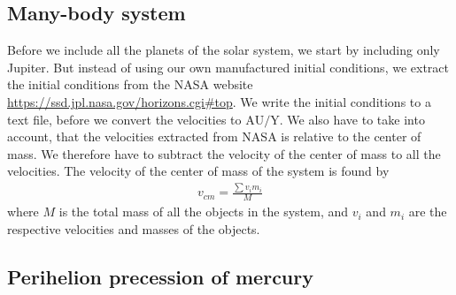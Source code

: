 \documentclass{article}
\begin{document}
\begin{multicols}{2}
\subsection{Many-body system}

Before we include all the planets of the solar system, we start by including only Jupiter. But instead of using our own manufactured initial conditions, we extract the initial conditions from the NASA website \url{https://ssd.jpl.nasa.gov/horizons.cgi#top}. We write the initial conditions to a text file, before we convert the velocities to $\text{AU/Y}$. We also have to take into account, that the velocities extracted from NASA is relative to the center of mass. We therefore have to subtract the velocity of the center of mass to all the velocities. The velocity of the center of mass of the system is found by 
\begin{align}
v_{cm} = \frac{\sum v_i m_i}{M}
\end{align}
where $M$ is the total mass of all the objects in the system, and $v_i$ and $m_i$ are the respective velocities and masses of the objects. 

\subsection{Perihelion precession of mercury}


\end{multicols}
\end{document}
